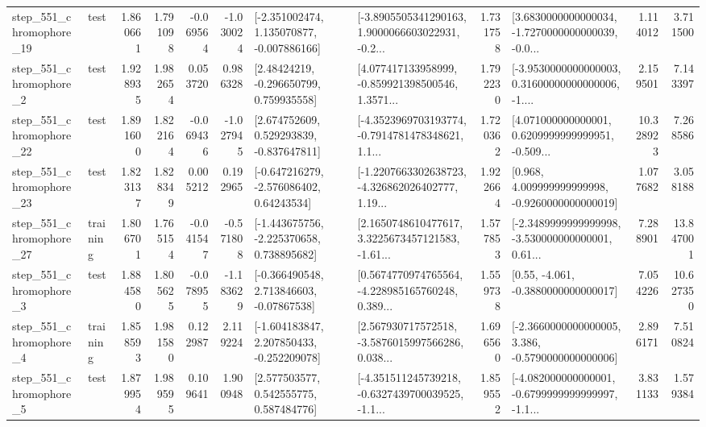 \begin{tabular}{llrrrrllrlrr}
  step\_551\_chromophore\_19 &      test &      1.860661 &    1.791098 &     -0.069564 & -1.030024 &   [-2.351002474, 1.135070877, -0.007886166] &  [-3.8905505341290163, 1.9000066603022931, -0.2... &       1.731758 &  [3.6830000000000034, -1.7270000000000039, -0.0... &            1.114012 &          3.711500 \\
   step\_551\_chromophore\_2 &      test &      1.928935 &    1.982654 &      0.053720 &  0.986328 &     [2.48424219, -0.296650799, 0.759935558] &  [4.077417133958999, -0.859921398500546, 1.3571... &       1.792230 &  [-3.9530000000000003, 0.31600000000000006, -1.... &            2.159501 &          7.143397 \\
  step\_551\_chromophore\_22 &      test &      1.891600 &    1.822164 &     -0.069436 & -1.027945 &    [2.674752609, 0.529293839, -0.837647811] &  [-4.3523969703193774, -0.7914781478348621, 1.1... &       1.720362 &  [4.071000000000001, 0.6209999999999951, -0.509... &           10.328923 &          7.268586 \\
  step\_551\_chromophore\_23 &      test &      1.823137 &    1.828349 &      0.005212 &  0.192965 &    [-0.647216279, -2.576086402, 0.64243534] &  [-1.2207663302638723, -4.326862026402777, 1.19... &       1.922664 &    [0.968, 4.009999999999998, -0.9260000000000019] &            1.077682 &          3.058188 \\
  step\_551\_chromophore\_27 &  training &      1.806701 &    1.765154 &     -0.041547 & -0.571808 &   [-1.443675756, -2.225370658, 0.738895682] &  [2.1650748610477617, 3.3225673457121583, -1.61... &       1.577853 &  [-2.3489999999999998, -3.530000000000001, 0.61... &            7.288901 &         13.847001 \\
   step\_551\_chromophore\_3 &      test &      1.884580 &    1.805625 &     -0.078955 & -1.183629 &    [-0.366490548, 2.713846603, -0.07867538] &  [0.5674770974765564, -4.228985165760248, 0.389... &       1.559738 &                [0.55, -4.061, -0.3880000000000017] &            7.054226 &         10.627350 \\
   step\_551\_chromophore\_4 &  training &      1.858593 &    1.981580 &      0.122987 &  2.119224 &   [-1.604183847, 2.207850433, -0.252209078] &  [2.567930717572518, -3.5876015997566286, 0.038... &       1.696560 &  [-2.3660000000000005, 3.386, -0.5790000000000006] &            2.896171 &          7.510824 \\
   step\_551\_chromophore\_5 &      test &      1.879954 &    1.989595 &      0.109641 &  1.900948 &     [2.577503577, 0.542555775, 0.587484776] &  [-4.351511245739218, -0.6327439700039525, -1.1... &       1.859552 &  [-4.082000000000001, -0.6799999999999997, -1.1... &            3.831133 &          1.579384 \\

\end{tabular}
